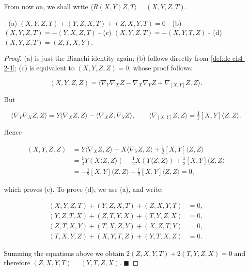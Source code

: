 \begin{proposition}
  \label{prop:dc-ch4-2-5}
  \leanok
  From now on, we shall write $\langle R(X,Y)Z,T\rangle=(X,Y,Z,T)$.
  
  - (a) $(X,Y,Z,T)+(Y,Z,X,T)+(Z,X,Y,T)=0$
  - (b) $(X,Y,Z,T)=-(Y,X,Z,T)$
  - (c) $(X,Y,Z,T)=-(X,Y,T,Z)$
  - (d) $(X,Y,Z,T)=(Z,T,X,Y)$.
\end{proposition}
\begin{proof}
  \leanok
  (a) is just the Bianchi identity again; (b) follows directly from \cref{def:dc-ch4-2-1};
  (c) is equivalent to $(X,Y,Z,Z)=0$, whose proof follows:
  
  $$
  (X,Y,Z,Z)=\langle\nabla_Y\nabla_X Z-\nabla_X\nabla_Y Z+\nabla_{[X,Y]}Z,Z\rangle.
  $$
  
  But
  
  $$
  \langle\nabla_Y\nabla_X Z,Z\rangle=Y\langle\nabla_X Z,Z\rangle-\langle\nabla_X Z,\nabla_Y Z\rangle,\qquad\langle\nabla_{[X,Y]}Z,Z\rangle=\tfrac{1}{2}[X,Y]\langle Z,Z\rangle.
  $$
  
  Hence
  
  $$
  \begin{aligned}(X,Y,Z,Z)&=Y\langle\nabla_X Z,Z\rangle-X\langle\nabla_Y Z,Z\rangle+\tfrac{1}{2}[X,Y]\langle Z,Z\rangle\\&=\tfrac{1}{2}Y(X\langle Z,Z\rangle)-\tfrac{1}{2}X(Y\langle Z,Z\rangle)+\tfrac{1}{2}[X,Y]\langle Z,Z\rangle\\&=-\tfrac{1}{2}[X,Y]\langle Z,Z\rangle+\tfrac{1}{2}[X,Y]\langle Z,Z\rangle=0,\end{aligned}
  $$
  
  which proves (c). To prove (d), we use (a), and write:
  
  $$
  \begin{aligned}(X,Y,Z,T)+(Y,Z,X,T)+(Z,X,Y,T)&=0,\\(Y,Z,T,X)+(Z,T,Y,X)+(T,Y,Z,X)&=0,\\(Z,T,X,Y)+(T,X,Z,Y)+(X,Z,T,Y)&=0,\\(T,X,Y,Z)+(X,Y,T,Z)+(Y,T,X,Z)&=0.\end{aligned}
  $$
  
  Summing the equations above we obtain $2(Z,X,Y,T)+2(T,Y,Z,X)=0$ and therefore
  $(Z,X,Y,T)=(Y,T,Z,X)$. $\blacksquare$
\end{proof}

